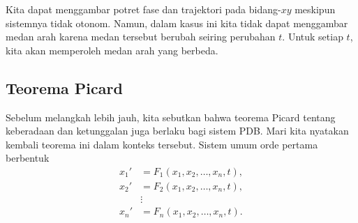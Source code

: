 \begin{myfig}
\parbox[t]{3.0in}{
 \capstart
 \caption{Medan arah untuk $x' = 2y-x$, $y' = x$.%
 \label{sintro-vectorfield:fig}}
}
\quad
\parbox[t]{3.0in}{
 \capstart
 \caption{Medan arah untuk $x' = 2y-x$, $y' = x$ dengan
 trajektori solusi yang berawal di $(1,0)$
 untuk $0 \leq t \leq 2$.%
 \label{sintro-vectorfield-sol:fig}}
}
\end{myfig}

Kita dapat menggambar potret fase dan trajektori pada bidang-$xy$
meskipun sistemnya tidak otonom.  Namun, dalam kasus ini kita tidak dapat menggambar
medan arah karena medan tersebut berubah seiring perubahan $t$.  Untuk
setiap $t$, kita akan memperoleh medan arah yang berbeda.

\subsection{Teorema Picard}

Sebelum melangkah lebih jauh, kita sebutkan bahwa teorema Picard tentang
keberadaan dan ketunggalan juga berlaku bagi sistem PDB.
Mari kita nyatakan kembali teorema ini dalam konteks tersebut.
Sistem umum orde pertama
berbentuk
\begin{equation} \label{eq:general-system}
\begin{aligned}
x_1' & = F_1(x_1,x_2,\ldots,x_n,t) , \\
x_2' & = F_2(x_1,x_2,\ldots,x_n,t) , \\
& \vdots \\
x_n' & = F_n(x_1,x_2,\ldots,x_n,t) .
\end{aligned}
\end{equation}

